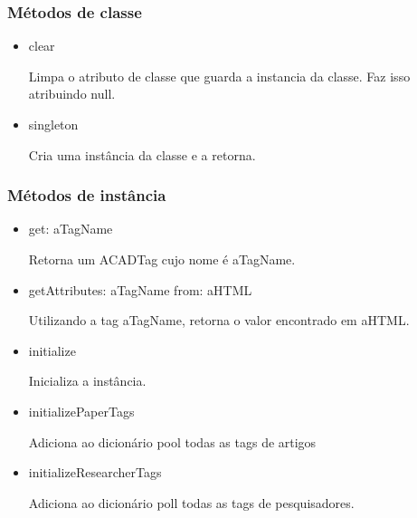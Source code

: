 \subsubsection{Métodos de classe}

\begin{itemize}

  \item clear

  Limpa o atributo de classe que guarda a instancia da classe. Faz isso atribuindo null.

  \item singleton

  Cria uma instância da classe e a retorna.

\end{itemize}

\subsubsection{Métodos de instância}

\begin{itemize}
  \item get: aTagName

  Retorna um ACADTag cujo nome é aTagName.

  \item getAttributes: aTagName from: aHTML

  Utilizando a tag aTagName, retorna o valor encontrado em aHTML.

  \item initialize

  Inicializa a instância.

  \item initializePaperTags

  Adiciona ao dicionário pool todas as tags de artigos

  \item initializeResearcherTags

  Adiciona ao dicionário poll todas as tags de pesquisadores.

\end{itemize}